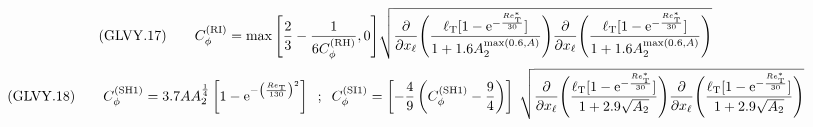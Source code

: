 \documentclass{article}
\begin{document}
\begin{equation}
({\rm GLVY}.17)\qquad
C_\phi^{(\mathrm{\tiny RI})}=\max{\left[{\frac{2}{3}-\frac{1}{6C_\phi^{(\mathrm{\tiny RH})}},0}\right]}
                          \sqrt{\frac{\partial}{\partial x_\ell}\Biggl(\frac{\ell_\mathrm{\tiny T}[1-\mathrm{e}^{-\frac{Re^*_\mathrm{\tiny T}}
                                                                                                       {30          }}]}
                                                                {1+1.6A_2^{\max(0.6,A)}}
                                                  \Biggr)
                                \frac{\partial}{\partial x_\ell}\Biggl(\frac{\ell_\mathrm{\tiny T}[1-\mathrm{e}^{-\frac{Re^*_\mathrm{\tiny T}}
                                                                                                       {30          }}]}
                                                                {1+1.6A_2^{\max(0.6,A)}}
                                                  \Biggr)
                                }
\end{equation}
\begin{equation}
({\rm GLVY}.18)\qquad
C_\phi^{(\mathrm{\tiny SH1})}=3.7 A A_2^{\frac{1}{4}}\left[1- \mathrm{e}^{-\left(\frac{Re_{\mathrm{\tiny T}}}
                                                                                     {130         }
                                                                         \right)^2}
                                                   \right]\;\; ; \;\;
C_\phi^{(\mathrm{\tiny SI1})}=\left[-\frac{4}{9}\left(C_\phi^{(\mathrm{\tiny SH1})}-\frac{9}{4}\right)\right]\;
                            \sqrt{\frac{\partial}{\partial x_\ell}\Biggl(\frac{\ell_\mathrm{\tiny T}[1-\mathrm{e}^{-\frac{Re^*_\mathrm{\tiny T}}
                                                                                            {30                 }}]}
                                                                 {1+2.9\sqrt{A_2}}
                                                    \Biggr)
                                   \frac{\partial}{\partial x_\ell}\Biggl(\frac{\ell_\mathrm{\tiny T}[1-\mathrm{e}^{-\frac{Re^*_\mathrm{\tiny T}}
                                                                                            {30                 }}]}
                                                                 {1+2.9\sqrt{A_2}}
                                                    \Biggr)
                            }
\end{equation}
\end{document}
